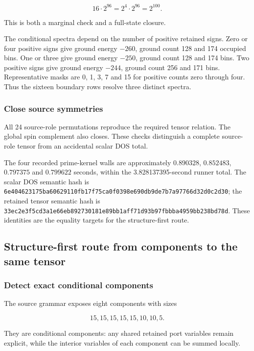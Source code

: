 \[
16\cdot2^{96}=2^4\cdot2^{96}=2^{100}.
\]

This is both a marginal check and a full-state closure.

The conditional spectra depend on the number of positive retained signs. Zero or four positive signs give ground energy $-260$, ground count 128 and 174 occupied bins. One or three give ground energy $-250$, ground count 128 and 174 bins. Two positive signs give ground energy $-244$, ground count 256 and 171 bins. Representative masks are 0, 1, 3, 7 and 15 for positive counts zero through four. Thus the sixteen boundary rows resolve three distinct spectra.

\subsubsection{Close source symmetries}\label{viii-ch01-close-source-symmetries}

All 24 source-role permutations reproduce the required tensor relation.
The global spin complement also closes. These checks distinguish a complete source-role tensor from an accidental scalar DOS total.

The four recorded prime-kernel walls are approximately $0.890328$, $0.852483$, $0.797375$ and $0.799622$ seconds, within the 3.828137395-second runner total. The scalar DOS semantic hash is \nolinkurl{6e404623175ba60629110fb17f75ca0f0398e690db9de7b7a97766d32d0c2d30}; the retained tensor semantic hash is \nolinkurl{33ec2e3f5cd3a1e66eb892730181e89bb1aff71d93b97fbbba4959bb238bd78d}. These identities are the equality targets for the structure-first route.

\subsection{Structure-first route from components to the same
tensor}\label{viii-ch01-structure-first-route-from-components-to-the-same-tensor}

\subsubsection{Detect exact conditional
components}\label{viii-ch01-detect-exact-conditional-components}

The source grammar exposes eight components with sizes

\[
15,15,15,15,15,10,10,5.
\]

They are conditional components: any shared retained port variables
remain explicit, while the interior variables of each component can be
summed locally.

